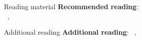 \documentclass[11pt,aspectratio=169]{beamer}
\begin{document}
\begin{frame}[fragile]{Reading material}
    \textbf{Recommended reading}:\\ \;
        ~\cite[Ch. 3--3.1.4, 7]{tamarin-book},
        ~\cite[Ch. 2]{meier2013thesis}
    \begin{refsection}
        \nocite{tamarin-book, meier2013thesis}
        \printbibliography[heading=none]
    \end{refsection}
\end{frame}

\begin{frame}[fragile]{Additional reading}
    \textbf{Additional reading}:
        ~\cite[Ch. 2, 10--11]{baader1998terms},
        ~\cite{dreier2018xor}
    \begin{refsection}
        \nocite{dreier2018xor, baader1998terms}
        \printbibliography[heading=none]
    \end{refsection}
\end{frame}
\end{document}
